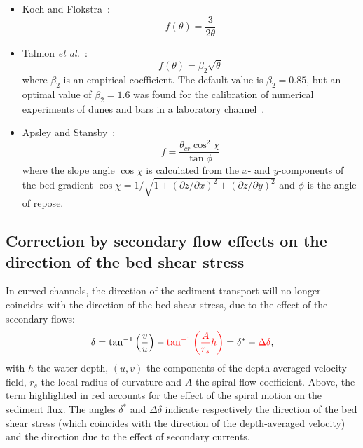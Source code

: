 \begin{itemize}
\item Koch and Flokstra~\cite{KochFlokstra80}:
\begin{equation*}
f(\theta) = \frac{3}{2\theta}
\end{equation*}
\item Talmon \textit{et al.}~\cite{Talmon95}:
\begin{equation*}
f(\theta) = \beta_2\sqrt{\theta}
\end{equation*}
where $\beta_2$ is an empirical coefficient. The default value is $\beta_2=0.85$, but an optimal value of $\beta_2=1.6$ was found for the calibration of numerical experiments of dunes and bars in a laboratory channel~\cite{Mendoza15}.
\item Apsley and Stansby~\cite{ApsleyStansby2008}:
\begin{equation*}
f = \frac{\theta_{cr} \cos^2\chi}{\tan\phi}
\end{equation*}
where the slope angle $\cos\chi$ is calculated from the $x$- and $y$-components
of the bed gradient $\cos\chi = 1/\sqrt{1 + (\partial z/\partial x)^2 + (\partial z/\partial y)^2}$ and $\phi$ is the angle of repose.

\end{itemize}

\subsection{Correction by secondary flow effects on the direction of the bed shear stress}
In curved channels, the direction of the sediment transport will no longer coincides with the direction of the bed shear stress,
due to the effect of the secondary flows:
\begin{equation}\label{eq:delta}
\delta = \tan^{-1}\left(\frac{v}{u}\right) - \textcolor{red}{\tan^{-1}\left(\frac{A}{r_s}h\right)} = \delta^* - \textcolor{red}{\Delta\delta},
\end{equation}
with $h$ the water depth, $(u,v)$ the components of the depth-averaged velocity field, $r_s$ the local radius of curvature and $A$ the spiral flow coefficient. Above, the term highlighted in red accounts for the effect of the spiral motion on the sediment flux. The angles $\delta^*$ and $\Delta\delta$ indicate respectively the direction of the bed shear stress (which coincides with the direction of the depth-averaged velocity) and the direction due to the effect of secondary currents.


